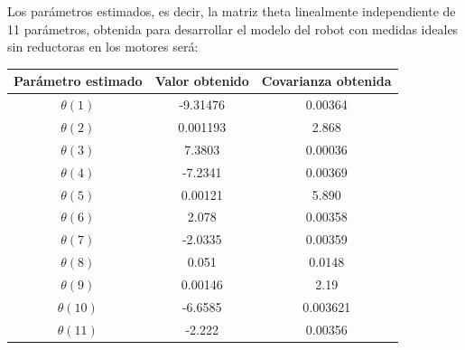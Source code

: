 Los parámetros estimados, es decir, la matriz theta linealmente independiente de 11 parámetros, obtenida para desarrollar el modelo del robot con medidas ideales sin reductoras en los motores será:

\begin{center}

	\begin{tabular}{| c | c | c |}



		\hline

		Parámetro estimado & Valor obtenido & Covarianza obtenida \\

		\hline

		$\theta(1) $ & -9.31476 & 0.00364 \\

		\hline

		$\theta(2) $ & 0.001193 & 2.868 \\

		\hline

		$\theta(3) $ & 7.3803 & 0.00036 \\

		\hline

		$\theta(4) $ & -7.2341 & 0.00369 \\

		\hline

		$\theta(5) $ & 0.00121 & 5.890 \\

		\hline

		$\theta(6) $ & 2.078 & 0.00358 \\

		\hline

		$\theta(7) $ & -2.0335 & 0.00359 \\

		\hline

		$\theta(8) $ & 0.051 & 0.0148 \\

		\hline

		$\theta(9) $ & 0.00146 & 2.19 \\

		\hline

		$\theta(10) $ & -6.6585 & 0.003621 \\

		\hline

		$\theta(11) $ & -2.222 & 0.00356 \\

		\hline

	\end{tabular}

\end{center}

